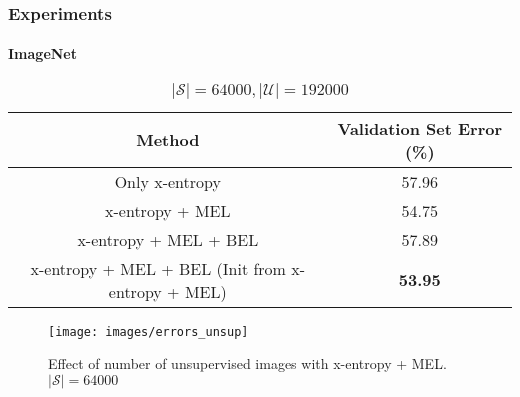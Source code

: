 \begin{frame}
	\frametitle{Experiments}
	\framesubtitle{ImageNet}
	\begin{table}
		\centering
		\resizebox{\textwidth}{!}
		{
		\begin{tabular}{|c|c|}
			\hline
			\textbf{Method} & Validation Set Error (\%)\\
			\hline
			Only x-entropy & 57.96\\
			x-entropy + MEL & 54.75\\
			x-entropy + MEL + BEL & 57.89\\
			x-entropy + MEL + BEL (Init from x-entropy + MEL) & \textbf{53.95}\\
			\hline
		\end{tabular}
		}
		\vspace{-15pt}
		\caption{\tiny{$|\mathcal{S}| = 64000, |\mathcal{U}| = 192000$}}
	\end{table}
	\vspace{-10pt}
	\begin{figure}
		\centering
		\texttt{[image: images/errors\_unsup]}
		\vspace{-12pt}
		\caption{\tiny{Effect of number of unsupervised images with x-entropy + MEL. $|\mathcal{S}|
		= 64000$}}
	\end{figure}
\end{frame}


